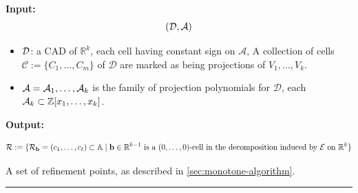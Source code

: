 \documentclass[
]{book}
\theoremstyle{definition}
\theoremstyle{definition}
\theoremstyle{definition}
\theoremstyle{definition}
\theoremstyle{remark}
\begin{document}
\citep[Extension of][Algorithm 5.15]{lazard10}

\textbf{Input:}
\[({\cal D}, {\cal A})\]

\begin{itemize}
\item
  \(\cal D\): a CAD of \(\mathbb{R}^k\), each cell having constant sign on \(\mathcal{A}\), A collection of cells \(\mathcal{C} := \{ C_1,\ldots,C_m \}\) of \(\mathcal{D}\) are marked as being projections of \(V_1,\ldots,V_k\).
\item
  \({\cal A} = {\cal A}_1,\ldots,{\cal A}_k\) is the family of projection polynomials for \(\mathcal{D}\), each \({\cal A}_k \subset \mathbb{Z}[x_1,\ldots,x_k]\).
\end{itemize}

\textbf{Output:}

\[
{\cal R} := \{ {\cal R}_{\mathbf{b}} = ( c_1,\ldots,c_t ) \subset \mathbb{A}\mid \mathbf{b} \in \mathbb{R}^{k-1} \text{ is a } (0,\ldots,0) \text{-cell in the decomposition induced by } {\cal E} \text{ on } \mathbb{R}^k \}
\]

A set of refinement points, as described in \ref{sec:monotone-algorithm}.

\begin{center}\rule{0.5\linewidth}{0.5pt}\end{center}
\end{document}

